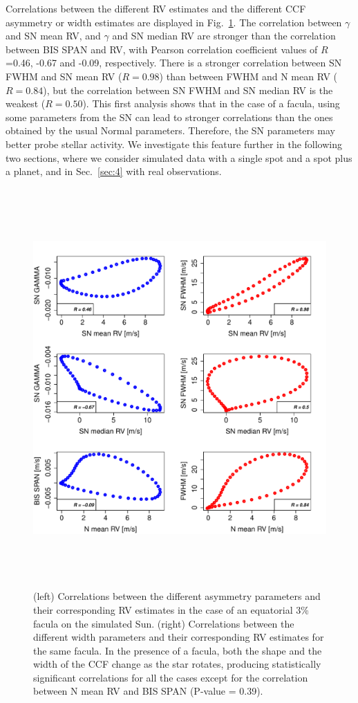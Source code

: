 \documentclass{aa}
\begin{document}
Correlations between the different RV estimates and the different CCF asymmetry or width estimates are displayed in Fig.~\ref{fig:faculae.corr}. 
The correlation between $\gamma$ and SN mean RV, and $\gamma$ and SN median RV are stronger than the correlation between BIS SPAN and RV, with Pearson correlation coefficient values of $R$=0.46, -0.67 and -0.09, respectively. 
%
There is a stronger correlation between SN FWHM and SN mean RV ($R=0.98$) than between FWHM and N mean RV ($R=0.84$), but the correlation between SN FWHM and SN median RV is the weakest ($R=0.50$). 
This first analysis shows that in the case of a facula, using some parameters from the SN can lead to stronger correlations than the ones obtained by the usual Normal parameters. Therefore, the SN parameters may better probe stellar activity. 
We investigate this feature further in the following two sections, where we consider simulated data with a single spot and a spot plus a planet, and in Sec.~\ref{sec:4} with real observations.

\begin{figure}[htbp]
\begin{center}
\includegraphics[height = 6in]{SOAP_FACULAE_Comparison_para_SN.pdf} 
   \caption{(left) Correlations between the different asymmetry parameters and their corresponding RV estimates in the case of an equatorial 3\% facula on the simulated Sun. (right) Correlations between the different width parameters and their corresponding RV estimates for the same facula.
   In the presence of a facula, both the shape and the width of the CCF change as the star rotates, producing statistically significant correlations for all the cases except for the correlation between N mean RV and BIS SPAN (P-value = 0.39).
   }
    \label{fig:faculae.corr}
\end{center}
\end{figure}
\end{document}
